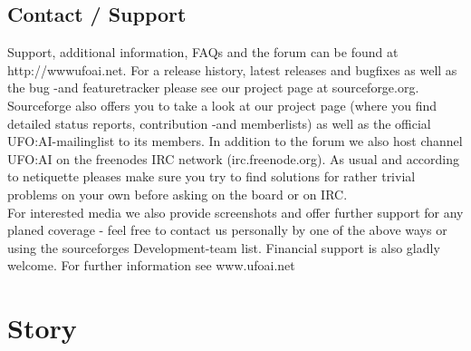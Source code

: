 \subsection{Contact / Support}
Support, additional information, FAQs and the forum can be found at http://wwwufoai.net. %
For a release history, latest releases and bugfixes as well as the bug -and featuretracker please see our project page at sourceforge.org. %
Sourceforge also offers you to take a look at our project page (where you find detailed status reports, contribution -and memberlists) as well as the official UFO:AI-mailinglist to its members. In addition to the forum we also host channel UFO:AI on the freenodes IRC network (irc.freenode.org).  As usual and according to netiquette pleases make sure you try to find solutions for rather trivial problems on your own before asking on the board or on IRC.\\
For interested media we also provide screenshots and offer further support for any planed coverage - feel free to contact us personally by one of the above ways or using the sourceforges Development-team list.
Financial support is also gladly welcome. For further information see www.ufoai.net

\newpage

\section{Story}
